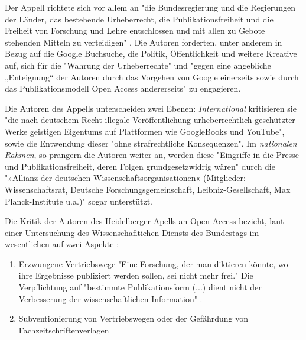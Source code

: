 Der Appell richtete sich vor allem an "die Bundesregierung und die Regierungen der Länder, das bestehende Urheberrecht, die Publikationsfreiheit und die Freiheit von Forschung und Lehre entschlossen und mit allen zu Gebote stehenden Mitteln zu verteidigen" \cite{ITK_2009}. Die Autoren forderten, unter anderem in Bezug auf die Google Buchsuche, die Politik, Öffentlichkeit und weitere Kreative auf, sich für die "Wahrung der Urheberrechte" und "gegen eine angebliche „Enteignung“ der Autoren durch das Vorgehen von Google einerseits sowie durch das Publikationsmodell Open Access andererseits" \cite{WD_bundestag_2009} zu engagieren.

Die Autoren des Appells unterscheiden zwei Ebenen: \textit{International} kritisieren sie "die nach deutschem Recht illegale Veröffentlichung urheberrechtlich geschützter Werke geistigen Eigentums auf Plattformen wie GoogleBooks und YouTube", sowie die Entwendung dieser "ohne strafrechtliche Konsequenzen". Im \textit{nationalen Rahmen}, so prangern die Autoren weiter an, werden diese "Eingriffe in die Presse- und Publikationsfreiheit, deren Folgen grundgesetzwidrig wären" durch die "»Allianz der deutschen Wissenschaftsorganisationen« (Mitglieder: Wissenschaftsrat, Deutsche Forschungsgemeinschaft, Leibniz-Gesellschaft, Max Planck-Institute u.a.)" sogar unterstützt.\cite{ITK_2009}

Die Kritik der Autoren des Heidelberger Apells an Open Access bezieht, laut einer Untersuchung des Wissenschafltichen Diensts des Bundestags im wesentlichen auf zwei Aspekte \cite{WD_bundestag_2009}:
\begin{enumerate}
\item Erzwungene Vertriebswege
"Eine Forschung, der man diktieren könnte, wo ihre Ergebnisse publiziert werden sollen, sei nicht mehr frei." Die Verpflichtung auf "bestimmte Publikationsform (...) dient nicht der Verbesserung der wissenschaftlichen Information" \cite{ITK_2009}.
\item Subventionierung von Vertriebswegen oder der Gefährdung von Fachzeitschriftenverlagen
\end{enumerate}

